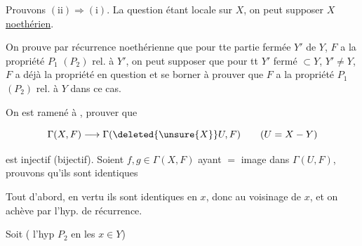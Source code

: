 
Prouvons $(\mathrm{ii})\Longrightarrow(\mathrm{i})$. La question étant locale sur $X$, on peut supposer $X$ \uline{noethérien}.

On prouve par récurrence noethérienne que pour tte partie fermée $Y'$ de $Y$, $F$ a la propriété $P_1$ $(P_2)$ rel. à $Y'$, on peut supposer que pour tt $Y'$ fermé $\subset Y$, $Y'\ne Y$, $F$ a déjà la propriété en question  et se borner à prouver que $F$ a la propriété $P_1$ $(P_2)$ rel. à $Y$ dans ce cas.

 On est ramené à , prouver que

\[
\Gamma(X,F)\longrightarrow\Gamma(\deleted{\unsure{X}}U,F)\qquad (U=X-Y)
\]

est injectif (bijectif). Soient $f,g\in\Gamma(X,F)$ ayant $=$ image dans $\Gamma(U,F)$, prouvons qu'ils sont identiques\unsure{;|,} 


 Tout d'abord, en vertu   ils sont identiques en $x$, donc au voisinage de $x$, et on achève par l'hyp. de récurrence.

Soit  ( l'hyp $P_2$ en les $x\in Y$)

